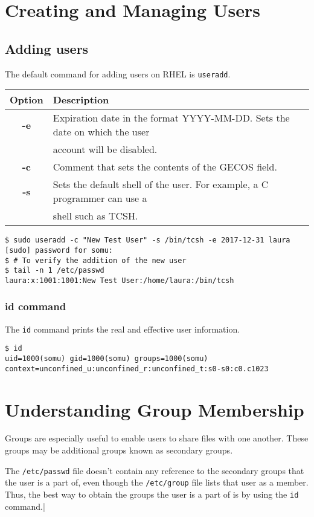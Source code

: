 \section{Creating and Managing Users}
\subsection{Adding users}
The default command for adding users on RHEL is \verb|useradd|. 

\begin{tabular}{cl}
	\toprule 
	\textbf{Option} &\textbf{Description} \\
	\midrule
	\textbf{-e} &Expiration date in the format YYYY-MM-DD. Sets the date on which the user \\&account will be disabled. \\
	\textbf{-c} &Comment that sets the contents of the GECOS field. \\
	\textbf{-s} &Sets the default shell of the user. For example, a C programmer can use a \\&shell such as TCSH. \\		
	\bottomrule		
\end{tabular}

\begin{verbatim}
$ sudo useradd -c "New Test User" -s /bin/tcsh -e 2017-12-31 laura
[sudo] password for somu: 
$ # To verify the addition of the new user
$ tail -n 1 /etc/passwd
laura:x:1001:1001:New Test User:/home/laura:/bin/tcsh
\end{verbatim}

\subsubsection{id command}
The \verb|id| command prints the real and effective user information. 

\begin{verbatim}
$ id
uid=1000(somu) gid=1000(somu) groups=1000(somu) context=unconfined_u:unconfined_r:unconfined_t:s0-s0:c0.c1023
\end{verbatim}

\section{Understanding Group Membership}
Groups are especially useful to enable users to share files with one another. These groups may be additional groups known as secondary groups. 

The \verb|/etc/passwd| file doesn't contain any reference to the secondary groups that the user is a part of, even though the \verb|/etc/group| file lists that user as a member. Thus, the best way to obtain the groups the user is a part of is by using the \verb|id| command.|

